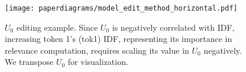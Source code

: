 
\begin{figure}[!ht]
    \centering
    \texttt{[image: paperdiagrams/model\_edit\_method\_horizontal.pdf]}
    \caption{\(U_0\) editing example. Since \(U_0\) is negatively correlated with IDF, increasing token 1's (tok1) IDF, representing its importance in relevance computation, requires scaling its value in \(U_0\) negatively. We transpose \(U_0\) for visualization.}
    \label{fig:model_edit_method}
\end{figure}
